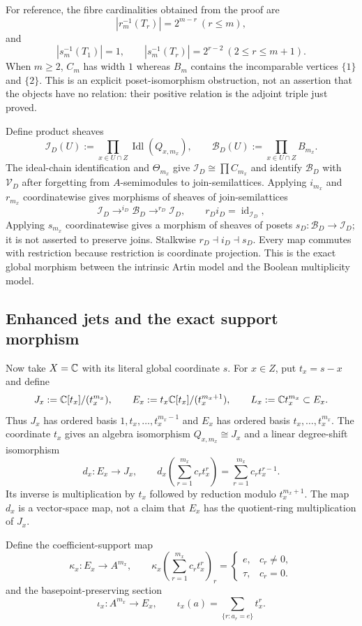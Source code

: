 For reference, the fibre cardinalities obtained from the proof are
\[
 |r_m^{-1}(T_r)|=2^{m-r}\ (r\leq m),
\]
and
\[
 |s_m^{-1}(T_1)|=1,\qquad
 |s_m^{-1}(T_r)|=2^{r-2}\ (2\leq r\leq m+1).
\]
When $m\geq2$, $C_m$ has width $1$ whereas $B_m$ contains the incomparable
vertices $\{1\}$ and $\{2\}$.  This is an explicit poset-isomorphism obstruction,
not an assertion that the objects have no relation: their positive relation is the
adjoint triple just proved.

Define product sheaves
\[
 \mathcal I_D(U):=\prod_{x\in U\cap Z}\operatorname{Idl}(Q_{x,m_x}),
 \qquad
 \mathcal B_D(U):=\prod_{x\in U\cap Z}B_{m_x}.
\]
The ideal-chain identification and $\Theta_{m_x}$ give
$\mathcal I_D\cong\prod C_{m_x}$ and identify $\mathcal B_D$ with
$\mathcal V_D$ after forgetting from $A$-semimodules to join-semilattices.  Applying
$i_{m_x}$ and $r_{m_x}$ coordinatewise gives morphisms of sheaves of
join-semilattices
\[
 \mathcal I_D\mathop{\longrightarrow}^{i_D}\mathcal B_D
 \mathop{\longrightarrow}^{r_D}\mathcal I_D,
 \qquad r_Di_D=\operatorname{id}_{\mathcal I_D},
\]
Applying $s_{m_x}$ coordinatewise gives a morphism of sheaves of posets
$s_D:\mathcal B_D\to\mathcal I_D$; it is not asserted to preserve joins.  Stalkwise
$r_D\dashv i_D\dashv s_D$.  Every map commutes with restriction
because restriction is coordinate projection.  This is the exact global morphism
between the intrinsic Artin model and the Boolean multiplicity model.

\subsection{Enhanced jets and the exact support morphism}

Now take $X=\mathbb C$ with its literal global coordinate $s$.  For $x\in Z$, put
$t_x=s-x$ and define
\[
 J_x:=\mathbb C[t_x]/(t_x^{m_x}),
 \qquad
 E_x:=t_x\mathbb C[t_x]/(t_x^{m_x+1}),
 \qquad
 L_x:=\mathbb C t_x^{m_x}\subset E_x.
\]
Thus $J_x$ has ordered basis $1,t_x,\ldots,t_x^{m_x-1}$ and $E_x$ has ordered
basis $t_x,\ldots,t_x^{m_x}$.  The coordinate $t_x$ gives an algebra isomorphism
$Q_{x,m_x}\cong J_x$ and a linear degree-shift isomorphism
\[
 d_x:E_x\longrightarrow J_x,
 \qquad
 d_x\left(\sum_{r=1}^{m_x}c_rt_x^r\right)
   =\sum_{r=1}^{m_x}c_rt_x^{r-1}.
\]
Its inverse is multiplication by $t_x$ followed by reduction modulo
$t_x^{m_x+1}$.  The map $d_x$ is a vector-space map, not a claim that $E_x$ has
the quotient-ring multiplication of $J_x$.

Define the coefficient-support map
\[
 \kappa_x:E_x\longrightarrow A^{m_x},
 \qquad
 \kappa_x\left(\sum_{r=1}^{m_x}c_rt_x^r\right)_r=
 \begin{cases}e,&c_r\ne0,\\ \tau,&c_r=0.\end{cases}
\]
and the basepoint-preserving section
\[
 \iota_x:A^{m_x}\longrightarrow E_x,
 \qquad
 \iota_x(a)=\sum_{\{r:a_r=e\}}t_x^r.
\]

